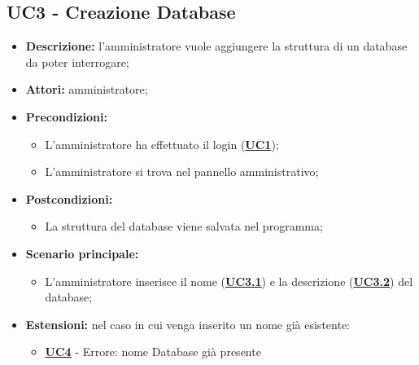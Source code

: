 \subsection{UC3 - Creazione Database}
\label{sec:UC3}
\begin{itemize}
	\item \textbf{Descrizione:} l’amministratore vuole aggiungere la struttura di un database da poter interrogare;
	\item \textbf{Attori:} amministratore;
	\item \textbf{Precondizioni:} 
	\begin{itemize}
		\item L’amministratore ha effettuato il login (\hyperref[sec:UC1]{\textbf{UC1}});
		\item L’amministratore si trova nel pannello amministrativo;
	\end{itemize}
	\item \textbf{Postcondizioni:} 
	\begin{itemize}
		\item La struttura del database viene salvata nel programma;
	\end{itemize}
	\item \textbf{Scenario principale:} 
	\begin{itemize}
		\item L’amministratore inserisce il nome (\hyperref[sec:UC3.1]{\textbf{UC3.1}}) e la descrizione (\hyperref[sec:UC3.2]{\textbf{UC3.2}}) del database;
	\end{itemize}
	\item \textbf{Estensioni:} nel caso in cui venga inserito un nome già esistente:
	\begin{itemize}
		\item \hyperref[sec:UC4]{\textbf{UC4}} - Errore: nome Database già presente
	\end{itemize}
\end{itemize}

